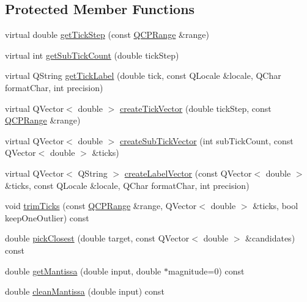 \subsection*{Protected Member Functions}
\begin{DoxyCompactItemize}
\item 
virtual double \mbox{\hyperlink{class_q_c_p_axis_ticker_a910d69bcec2de37e92d8d4e1ecf201e2}{get\+Tick\+Step}} (const \mbox{\hyperlink{class_q_c_p_range}{Q\+C\+P\+Range}} \&range)
\item 
virtual int \mbox{\hyperlink{class_q_c_p_axis_ticker_a4ccc403ced7a1457ce6ba293509933c8}{get\+Sub\+Tick\+Count}} (double tick\+Step)
\item 
virtual Q\+String \mbox{\hyperlink{class_q_c_p_axis_ticker_a8201eb4aa8be192bf786b126eb5ee089}{get\+Tick\+Label}} (double tick, const Q\+Locale \&locale, Q\+Char format\+Char, int precision)
\item 
virtual Q\+Vector$<$ double $>$ \mbox{\hyperlink{class_q_c_p_axis_ticker_af4645a824c7bd2ca8fc7e86ebf9055bd}{create\+Tick\+Vector}} (double tick\+Step, const \mbox{\hyperlink{class_q_c_p_range}{Q\+C\+P\+Range}} \&range)
\item 
virtual Q\+Vector$<$ double $>$ \mbox{\hyperlink{class_q_c_p_axis_ticker_a9a6435723fa0bd366d1ea4c2cff7c33f}{create\+Sub\+Tick\+Vector}} (int sub\+Tick\+Count, const Q\+Vector$<$ double $>$ \&ticks)
\item 
virtual Q\+Vector$<$ Q\+String $>$ \mbox{\hyperlink{class_q_c_p_axis_ticker_a804050e408f37a0b9770c6654ebe6aa7}{create\+Label\+Vector}} (const Q\+Vector$<$ double $>$ \&ticks, const Q\+Locale \&locale, Q\+Char format\+Char, int precision)
\item 
void \mbox{\hyperlink{class_q_c_p_axis_ticker_ab28cc1ab549489be7975f5ce7e717916}{trim\+Ticks}} (const \mbox{\hyperlink{class_q_c_p_range}{Q\+C\+P\+Range}} \&range, Q\+Vector$<$ double $>$ \&ticks, bool keep\+One\+Outlier) const
\item 
double \mbox{\hyperlink{class_q_c_p_axis_ticker_a4ea0a7c4ca1c610f92b9bd5944ab4260}{pick\+Closest}} (double target, const Q\+Vector$<$ double $>$ \&candidates) const
\item 
double \mbox{\hyperlink{class_q_c_p_axis_ticker_a2f1e223bafbf2cec7c3ba8b08d5c77e8}{get\+Mantissa}} (double input, double $\ast$magnitude=0) const
\item 
double \mbox{\hyperlink{class_q_c_p_axis_ticker_ac7df6c72876b7abd67c932663a0b0f6a}{clean\+Mantissa}} (double input) const
\end{DoxyCompactItemize}
